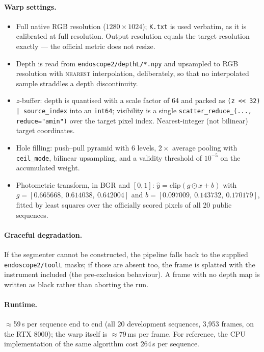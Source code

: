 \paragraph{Warp settings.}
\begin{itemize}\itemsep1pt
  \item Full native RGB resolution ($1280\times1024$); \texttt{K.txt} is used verbatim, as it is
        calibrated at full resolution. Output resolution equals the target resolution exactly --- the
        official metric does not resize.
  \item Depth is read from \texttt{endoscope2/depthL/*.npy} and upsampled to RGB resolution with
        \textsc{nearest} interpolation, deliberately, so that no interpolated sample straddles a depth
        discontinuity.
  \item $z$-buffer: depth is quantised with a scale factor of 64 and packed as
        \texttt{(z << 32) | source\_index} into an \texttt{int64}; visibility is a single
        \texttt{scatter\_reduce\_(..., reduce="amin")} over the target pixel index. Nearest-integer
        (not bilinear) target coordinates.
  \item Hole filling: push--pull pyramid with 6 levels, $2\times$ average pooling with
        \texttt{ceil\_mode}, bilinear upsampling, and a validity threshold of $10^{-5}$ on the
        accumulated weight.
  \item Photometric transform, in BGR and $[0,1]$: $\hat{y}=\mathrm{clip}(g\odot x + b)$ with
        $g = [0.665668,\ 0.614038,\ 0.642004]$ and $b = [0.097009,\ 0.143732,\ 0.170179]$, fitted by
        least squares over the officially scored pixels of all 20 public sequences.
\end{itemize}

\paragraph{Graceful degradation.} If the segmenter cannot be constructed, the pipeline falls back to the
supplied \texttt{endoscope2/toolL} masks; if those are absent too, the frame is splatted with the
instrument included (the pre-exclusion behaviour). A frame with no depth map is written as black rather
than aborting the run.

\paragraph{Runtime.} $\approx$59\,s per sequence end to end (all 20 development sequences,
3{,}953 frames, on the RTX 8000); the warp itself is $\approx$79\,ms per frame. For reference, the CPU
implementation of the same algorithm cost 264\,s per sequence.

